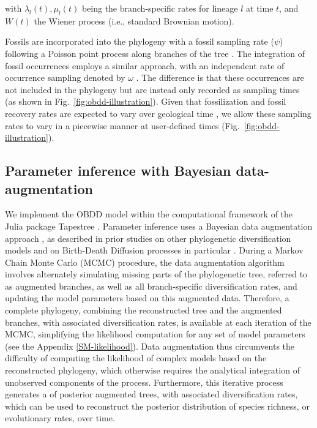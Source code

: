 \documentclass[oupdraft]{sysbio}
\begin{document}
with $\lambda_l(t), \mu_l(t)$ being the branch-specific rates for lineage $l$ at time $t$, and $W(t)$ the Wiener process (i.e., standard Brownian motion).

Fossils are incorporated into the phylogeny with a fossil sampling rate ($\psi$) following a Poisson point process along branches of the tree \citep{stadler_sampling-through-time_2010, heath_fossilized_2014}. The integration of fossil occurrences employs a similar approach, with an independent rate of occurrence sampling denoted by $\omega$ \citep{vaughan_estimating_2019}. The difference is that these occurrences are not included in the phylogeny but are instead only recorded as sampling times (as shown in Fig.~\ref{fig:obdd-illustration}). Given that fossilization and fossil recovery rates are expected to vary over geological time \citep{dominici_awkward_2020}, we allow these sampling rates to vary in a piecewise manner at user-defined times (Fig.~\ref{fig:obdd-illustration}).

\subsection{Parameter inference with Bayesian data-augmentation}

We implement the OBDD model within the computational framework of the Julia package Tapestree \citep{bezanson_julia_2017, quintero_tapestreejl_2020}. Parameter inference uses a Bayesian data augmentation approach \citep{tanner_calculation_1987}, as described in prior studies on other phylogenetic diversification models \citep{maliet_fast_2022, barido-sottani_clads_2023} and on Birth-Death Diffusion processes in particular \citep{quintero_imbalanced_2024, quintero_rise_2025}. During a Markov Chain Monte Carlo (MCMC) procedure, the data augmentation algorithm involves alternately simulating missing parts of the phylogenetic tree, referred to as augmented branches, as well as all branch-specific diversification rates, and updating the model parameters based on this augmented data. Therefore, a complete phylogeny, combining the reconstructed tree and the augmented branches, with associated diversification rates, is available at each iteration of the MCMC, simplifying the likelihood computation for any set of model parameters (see the Appendix \ref{SM-likelihood}). Data augmentation thus circumvents the difficulty of computing the likelihood of complex models based on the reconstructed phylogeny, which otherwise requires the analytical integration of unobserved components of the process. Furthermore, this iterative process generates a  of posterior augmented trees, with associated diversification rates, which can be used to reconstruct the posterior distribution of species richness, or evolutionary rates, over time.
\end{document}
